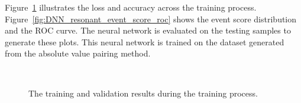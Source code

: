 \documentclass[12pt]{article}
\begin{document}
        Figure~\ref{fig:DNN_resonant_loss_accuracy} illustrates the loss and accuracy across the training process. Figure~\ref{fig:DNN_resonant_event_score_roc} shows the event score distribution and the ROC curve. The neural network is evaluated on the testing samples to generate these plots. This neural network is trained on the dataset generated from the absolute value pairing method.
        \begin{figure}[htpb]
            \centering
             \\
            \caption{The training and validation results during the training process.}
            \label{fig:DNN_resonant_loss_accuracy}
        \end{figure}
\end{document}
